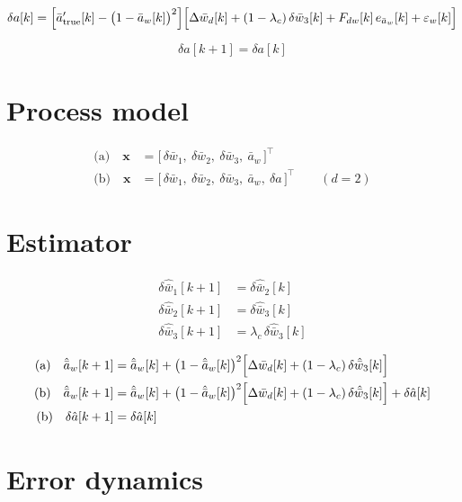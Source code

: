 \documentclass[11pt,a4paper,fontset=none]{ctexart}
\newcommand{\ba}{\bar{a}}
\newcommand{\bw}{\bar{w}}
\begin{document}
\begin{equation*}
\delta a[k]
  = \Bigl[\ba'_{\mathrm{true}}[k] - \bigl(1-\ba_w[k]\bigr)^{2}\Bigr]
     \Bigl[\Delta\bw_d[k] + (1-\lambda_c)\,\delta\bw_3[k]
       + F_{dw}[k]\,e_{\ba_w}[k] + \varepsilon_w[k]\Bigr]
\end{equation*}

\begin{equation*}
\delta a[k+1] = \delta a[k]
\end{equation*}

\section{Process model}

\begin{align*}
\text{(a)}\quad \mathbf{x}
  &= \bigl[\,\delta\bw_1,\ \delta\bw_2,\ \delta\bw_3,\ \ba_w\,\bigr]^{\top} \\
\text{(b)}\quad \mathbf{x}
  &= \bigl[\,\delta\bw_1,\ \delta\bw_2,\ \delta\bw_3,\ \ba_w,\
     \delta a\,\bigr]^{\top}
\qquad (d = 2)
\end{align*}

\section{Estimator}

\begin{align*}
\delta\hat{\bw}_1[k+1] &= \delta\hat{\bw}_2[k] \\
\delta\hat{\bw}_2[k+1] &= \delta\hat{\bw}_3[k] \\
\delta\hat{\bw}_3[k+1] &= \lambda_c\,\delta\hat{\bw}_3[k]
\end{align*}

\begin{align*}
\text{(a)}\quad \hat{\ba}_w[k+1] &= \hat{\ba}_w[k]
  + \bigl(1-\hat{\ba}_w[k]\bigr)^{2}
    \Bigl[\Delta\bw_d[k] + (1-\lambda_c)\,\delta\hat{\bw}_3[k]\Bigr] \\
\text{(b)}\quad \hat{\ba}_w[k+1] &= \hat{\ba}_w[k]
  + \bigl(1-\hat{\ba}_w[k]\bigr)^{2}
    \Bigl[\Delta\bw_d[k] + (1-\lambda_c)\,\delta\hat{\bw}_3[k]\Bigr]
  + \delta\hat{a}[k] \\
\text{(b)}\quad \delta\hat{a}[k+1] &= \delta\hat{a}[k]
\end{align*}

\section{Error dynamics}
\end{document}
